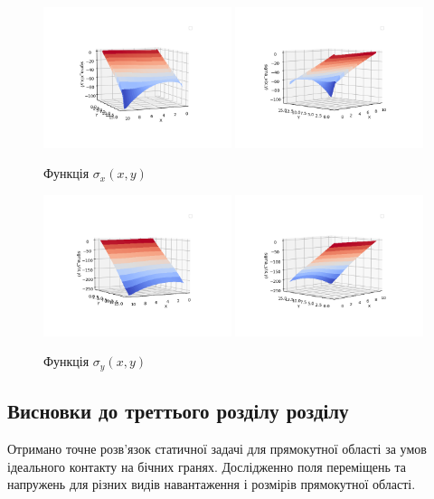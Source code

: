 \begin{figure}[h!]
    \begin{center}
        \includegraphics[width=0.49\textwidth, scale=1]{images/results/static_1/function_sigma_x_1.png}
        \includegraphics[width=0.49\textwidth, scale=1]{images/results/static_1/function_sigma_x_2.png}
        \caption{Функція $\sigma_x(x, y)$}\label{static_1_sigma_x_1}
    \end{center}
\end{figure}
\begin{figure}[h!]
    \begin{center}
        \includegraphics[width=0.49\textwidth, scale=1]{images/results/static_1/function_sigma_y_1.png}
        \includegraphics[width=0.49\textwidth, scale=1]{images/results/static_1/function_sigma_y_2.png}
        \caption{Функція $\sigma_y(x, y)$}\label{static_1_sigma_y_1}
    \end{center}
\end{figure}

\subsection{Висновки до треттього розділу розділу}
Отримано точне розв'язок статичної задачі для прямокутної області за умов ідеального контакту на бічних гранях.
Дослідженно поля переміщень та напружень для різних видів навантаження і розмірів прямокутної області.